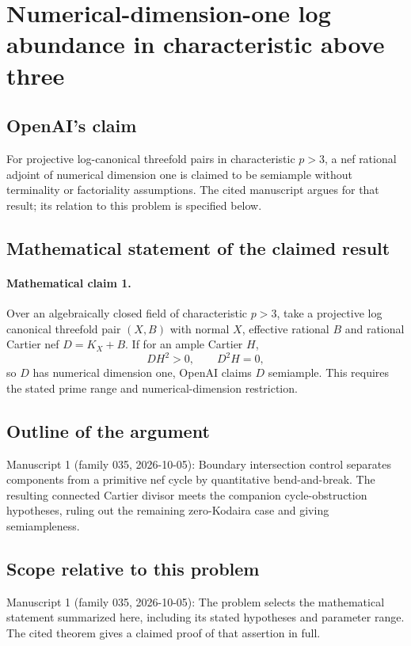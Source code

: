 \documentclass[11pt]{article}
\begin{document}
\section*{Numerical-dimension-one log abundance in characteristic above three}

\subsection{OpenAI's claim}
For projective log-canonical threefold pairs in characteristic $p>3$, a nef rational adjoint of numerical dimension one is claimed to be semiample without terminality or factoriality assumptions. The cited manuscript argues for that result; its relation to this problem is specified below.

\subsection{Mathematical statement of the claimed result}
\paragraph{Mathematical claim 1.} Over an algebraically closed field of characteristic $p>3$, take a projective log canonical threefold pair $(X,B)$ with normal $X$, effective rational $B$ and rational Cartier nef $D=K_X+B$. If for an ample Cartier $H$,
\[
DH^2>0,\qquad D^2H=0,
\]
so $D$ has numerical dimension one, OpenAI claims $D$ semiample. This requires the stated prime range and numerical-dimension restriction.

\subsection{Outline of the argument}
Manuscript 1 (family 035, 2026-10-05): Boundary intersection control separates components from a primitive nef cycle by quantitative bend-and-break. The resulting connected Cartier divisor meets the companion cycle-obstruction hypotheses, ruling out the remaining zero-Kodaira case and giving semiampleness.

\subsection{Scope relative to this problem}
Manuscript 1 (family 035, 2026-10-05): The problem selects the mathematical statement summarized here, including its stated hypotheses and parameter range. The cited theorem gives a claimed proof of that assertion in full.
\end{document}
